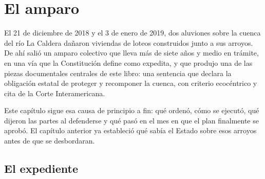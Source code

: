 \chapter{El amparo}

\label{cap:amparo}
El 21 de diciembre de 2018 y el 3 de enero de 2019, dos aluviones sobre la cuenca del río La Caldera dañaron
viviendas de loteos construidos junto a sus arroyos. De ahí salió un amparo colectivo que lleva más de siete años y medio en trámite, en una vía que la Constitución define como expedita, y que produjo una de las piezas documentales centrales de este libro: una sentencia
que declara la obligación estatal de proteger y recomponer la cuenca, con criterio
ecocéntrico y cita de la Corte Interamericana.

Este capítulo sigue esa causa de principio a fin: qué ordenó, cómo se ejecutó, qué
dijeron las partes al defenderse y qué pasó en el mes en que el plan finalmente se
aprobó. El capítulo anterior ya estableció qué sabía el Estado sobre esos arroyos antes
de que se desbordaran.

\section{El expediente}

